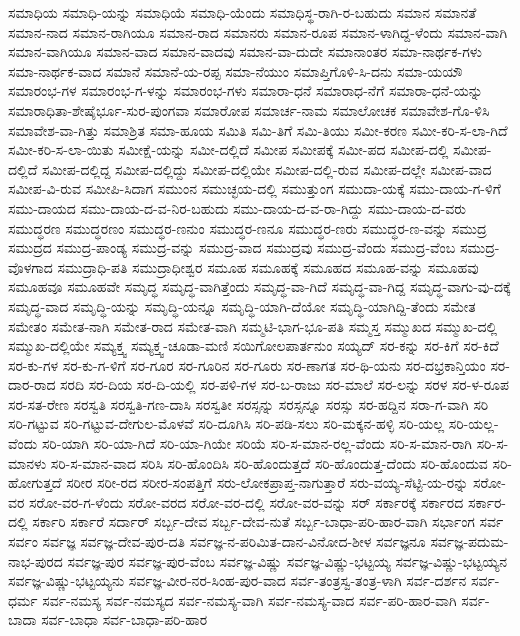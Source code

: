 ಸಮಾಧಿಯ
ಸಮಾಧಿ-ಯನ್ನು
ಸಮಾಧಿಯೆ
ಸಮಾಧಿ-ಯೆಂದು
ಸಮಾಧಿಸ್ಥ-ರಾಗಿ-ರ-ಬಹುದು
ಸಮಾನ
ಸಮಾನತೆ
ಸಮಾನ-ನಾದ
ಸಮಾನ-ರಾಗಿಯೂ
ಸಮಾನ-ರಾದ
ಸಮಾನರು
ಸಮಾನ-ರೂಪ
ಸಮಾನ-ಳಾಗಿದ್ದ-ಳೆಂದು
ಸಮಾನ-ವಾಗಿ
ಸಮಾನ-ವಾಗಿಯೂ
ಸಮಾನ-ವಾದ
ಸಮಾನ-ವಾದವು
ಸಮಾನ-ವಾ-ದುದೇ
ಸಮಾನಾಂತರ
ಸಮಾ-ನಾರ್ಥಕ-ಗಳು
ಸಮಾ-ನಾರ್ಥಕ-ವಾದ
ಸಮಾನೆ
ಸಮಾನೆ-ಯ-ರಪ್ಪ
ಸಮಾ-ನೆಯುಂ
ಸಮಾಪ್ತಿಗೊಳಿ-ಸಿ-ದನು
ಸಮಾ-ಯಯೌ
ಸಮಾರಂಭ-ಗಳ
ಸಮಾರಂಭ-ಗ-ಳನ್ನು
ಸಮಾರಂಭ-ಗಳು
ಸಮಾರಾ-ಧನೆ
ಸಮಾರಾಧ-ನೆಗೆ
ಸಮಾರಾ-ಧನೆ-ಯನ್ನು
ಸಮಾರಾಧಿತಾ-ಶೇಷೈರ್ಭೂ-ಸುರ-ಪುಂಗವಾ
ಸಮಾರೋಪ
ಸಮಾರ್ಚ-ನಾಮ
ಸಮಾಲೋಚಕ
ಸಮಾವೇಶ-ಗೊ-ಳಿಸಿ
ಸಮಾವೇಶ-ವಾ-ಗಿತ್ತು
ಸಮಾಶ್ರಿತ
ಸಮಾ-ಹೂಯ
ಸಮಿತಿ
ಸಮಿ-ತಿಗೆ
ಸಮಿ-ತಿಯು
ಸಮೀ-ಕರಣ
ಸಮೀ-ಕರಿ-ಸ-ಲಾ-ಗಿದೆ
ಸಮೀ-ಕರಿ-ಸ-ಲಾ-ಯಿತು
ಸಮೀಕ್ಷೆ-ಯನ್ನು
ಸಮೀ-ದಲ್ಲಿದೆ
ಸಮೀಪ
ಸಮೀಪಕ್ಕೆ
ಸಮೀ-ಪದ
ಸಮೀಪ-ದಲ್ಲಿ
ಸಮೀಪ-ದಲ್ಲಿದೆ
ಸಮೀಪ-ದಲ್ಲಿದ್ದ
ಸಮೀಪ-ದಲ್ಲಿದ್ದು
ಸಮೀಪ-ದಲ್ಲಿಯೇ
ಸಮೀಪ-ದಲ್ಲಿ-ರುವ
ಸಮೀಪ-ದಲ್ಲೇ
ಸಮೀಪ-ವಾದ
ಸಮೀಪ-ವಿ-ರುವ
ಸಮೀಪಿ-ಸಿದಾಗ
ಸಮುಂನ
ಸಮುಚ್ಛಯ-ದಲ್ಲಿ
ಸಮುತ್ತುಂಗ
ಸಮುದಾ-ಯಕ್ಕೆ
ಸಮು-ದಾಯ-ಗ-ಳಿಗೆ
ಸಮು-ದಾಯದ
ಸಮು-ದಾಯ-ದ-ವ-ನಿರ-ಬಹುದು
ಸಮು-ದಾಯ-ದ-ವ-ರಾ-ಗಿದ್ದು
ಸಮು-ದಾಯ-ದ-ವರು
ಸಮುದ್ಧರಣ
ಸಮುದ್ಧರಣಂ
ಸಮುದ್ಧರ-ಣನುಂ
ಸಮುದ್ಧರ-ಣನೂ
ಸಮುದ್ಧರ-ಣರು
ಸಮುದ್ಧರ-ಣ-ವನ್ನು
ಸಮುದ್ರ
ಸಮುದ್ರದ
ಸಮುದ್ರ-ಪಾಂಡ್ಯ
ಸಮುದ್ರ-ವನ್ನು
ಸಮುದ್ರ-ವಾದ
ಸಮುದ್ರವು
ಸಮುದ್ರ-ವೆಂದು
ಸಮುದ್ರ-ವೆಂಬ
ಸಮುದ್ರ-ವೊಳಗಾದ
ಸಮುದ್ರಾಧಿ-ಪತಿ
ಸಮುದ್ರಾಧೀಶ್ವರ
ಸಮೂಹ
ಸಮೂಹಕ್ಕೆ
ಸಮೂಹದ
ಸಮೂಹ-ವನ್ನು
ಸಮೂಹವು
ಸಮೂಹವೂ
ಸಮೂಹವೇ
ಸಮೃದ್ಧ
ಸಮೃದ್ಧ-ವಾಗಿತ್ತೆಂದು
ಸಮೃದ್ಧ-ವಾ-ಗಿದೆ
ಸಮೃದ್ಧ-ವಾ-ಗಿದ್ದ
ಸಮೃದ್ಧ-ವಾಗು-ವು-ದಕ್ಕೆ
ಸಮೃದ್ಧ-ವಾದ
ಸಮೃದ್ಧಿ-ಯನ್ನು
ಸಮೃದ್ಧಿ-ಯನ್ನೂ
ಸಮೃದ್ಧಿ-ಯಾಗಿ-ದೆಯೋ
ಸಮೃದ್ಧಿ-ಯಾಗಿದ್ದಿ-ತೆಂದು
ಸಮೇತ
ಸಮೇತಂ
ಸಮೇತ-ನಾಗಿ
ಸಮೇತ-ರಾದ
ಸಮೇತ-ವಾಗಿ
ಸಮ್ಮಟಿ-ಭಾಗ-ಭೂ-ಪತಿ
ಸಮ್ಮಸ್ತ
ಸಮ್ಮುಖದ
ಸಮ್ಮುಖ-ದಲ್ಲಿ
ಸಮ್ಮುಖ-ದಲ್ಲಿಯೇ
ಸಮ್ಯಕ್ತ್ವ
ಸಮ್ಯಕ್ತ್ವ-ಚೂಡಾ-ಮಣಿ
ಸಯಿಗೋಲಪಾರ್ತನುಂ
ಸಯ್ಯದ್
ಸರ-ಕನ್ನು
ಸರ-ಕಿಗೆ
ಸರ-ಕಿದೆ
ಸರ-ಕು-ಗಳ
ಸರ-ಕು-ಗ-ಳಿಗೆ
ಸರ-ಗೂರ
ಸರ-ಗೂರಿನ
ಸರ-ಗೂರು
ಸರ-ಣಾಗತ
ಸರ-ಥಿ-ಯನು
ಸರ-ದಭ್ರಕಾನ್ತಿಯಂ
ಸರ-ದಾರ-ರಾದ
ಸರದಿ
ಸರ-ದಿಯ
ಸರ-ದಿ-ಯಲ್ಲಿ
ಸರ-ಪಳಿ-ಗಳ
ಸರ-ಬ-ರಾಜು
ಸರ-ಮಾಲೆ
ಸರ-ಲನ್ನು
ಸರಳ
ಸರ-ಳ-ರೂಪ
ಸರ-ಸತ-ರೇಣ
ಸರಸ್ವತಿ
ಸರಸ್ವತಿ-ಗಣ-ದಾಸಿ
ಸರಸ್ವತೀ
ಸರಸ್ಸನ್ನು
ಸರಸ್ಸನ್ನೂ
ಸರಸ್ಸು
ಸರ-ಹದ್ದಿನ
ಸರಾ-ಗ-ವಾಗಿ
ಸರಿ
ಸರಿ-ಗಟ್ಟುವ
ಸರಿ-ಗಟ್ಟುವ-ದೇಗುಲ-ಮೊಳವೆ
ಸರಿ-ದೂಗಿಸಿ
ಸರಿ-ಪಡಿ-ಸಲು
ಸರಿ-ಮಕ್ಕನ-ಹಳ್ಳಿ
ಸರಿ-ಯಲ್ಲ
ಸರಿ-ಯಲ್ಲ-ವೆಂದು
ಸರಿ-ಯಾಗಿ
ಸರಿ-ಯಾ-ಗಿದೆ
ಸರಿ-ಯಾ-ಗಿಯೇ
ಸರಿಯೆ
ಸರಿ-ಸ-ಮಾನ-ರಲ್ಲ-ವೆಂದು
ಸರಿ-ಸ-ಮಾನ-ರಾಗಿ
ಸರಿ-ಸ-ಮಾನಳು
ಸರಿ-ಸ-ಮಾನ-ವಾದ
ಸರಿಸಿ
ಸರಿ-ಹೊಂದಿಸಿ
ಸರಿ-ಹೊಂದುತ್ತದೆ
ಸರಿ-ಹೊಂದುತ್ತ-ದೆಂದು
ಸರಿ-ಹೊಂದುವ
ಸರಿ-ಹೋಗುತ್ತದೆ
ಸರೀರ
ಸರೀ-ರದ
ಸರೀರ-ಸಂಪತ್ತಿಗೆ
ಸರು-ಲೋಕಪ್ರಾಪ್ತ-ನಾಗುತ್ತಾರೆ
ಸರು-ವಯ್ಯ-ಸೆಟ್ಟಿ-ಯ-ರನ್ನು
ಸರೋ-ವರ
ಸರೋ-ವರ-ಗ-ಳೆಂದು
ಸರೋ-ವರದ
ಸರೋ-ವರ-ದಲ್ಲಿ
ಸರೋ-ವರ-ವನ್ನು
ಸರ್
ಸರ್ಕಾರಕ್ಕೆ
ಸರ್ಕಾರದ
ಸರ್ಕಾರ-ದಲ್ಲಿ
ಸರ್ಕಾರಿ
ಸರ್ಕಾರೆ
ಸರ್ದಾರ್
ಸರ್ಬ್ಬ-ದೇವ
ಸರ್ಬ್ಬ-ದೇವ-ನುತೆ
ಸರ್ಬ್ಬ-ಬಾಧಾ-ಪರಿ-ಹಾರ-ವಾಗಿ
ಸರ್ಭಾಂಗ
ಸರ್ವ
ಸರ್ವಂ
ಸರ್ವಜ್ಞ
ಸರ್ವಜ್ಞ-ದೇವ-ಪುರ-ದತಿ
ಸರ್ವಜ್ಞ-ನ-ಪರಿಮಿತ-ದಾನ-ವಿನೋದ-ಶೀಳ
ಸರ್ವಜ್ಞನೂ
ಸರ್ವಜ್ಞ-ಪದುಮ-ನಾಭ-ಪುರದ
ಸರ್ವಜ್ಞ-ಪುರ
ಸರ್ವಜ್ಞ-ಪುರ-ವೆಂಬ
ಸರ್ವಜ್ಞ-ವಿಷ್ಣು
ಸರ್ವಜ್ಞ-ವಿಷ್ಣು-ಭಟ್ಟಯ್ಯ
ಸರ್ವಜ್ಞ-ವಿಷ್ಣು-ಭಟ್ಟಯ್ಯನ
ಸರ್ವಜ್ಞ-ವಿಷ್ಣು-ಭಟ್ಟಯ್ಯನು
ಸರ್ವಜ್ಞ-ವೀರ-ನರ-ಸಿಂಹ-ಪುರ-ವಾದ
ಸರ್ವ-ತಂತ್ರಸ್ವ-ತಂತ್ರ-ಳಾಗಿ
ಸರ್ವ-ದರ್ಶನ
ಸರ್ವ-ಧರ್ಮ
ಸರ್ವ-ನಮಸ್ಯ
ಸರ್ವ-ನಮಸ್ಯದ
ಸರ್ವ-ನಮಸ್ಯ-ವಾಗಿ
ಸರ್ವ-ನಮಸ್ಯ-ವಾದ
ಸರ್ವ-ಪರಿ-ಹಾರ-ವಾಗಿ
ಸರ್ವ-ಬಾದಾ
ಸರ್ವ-ಬಾಧಾ
ಸರ್ವ-ಬಾಧಾ-ಪರಿ-ಹಾರ
